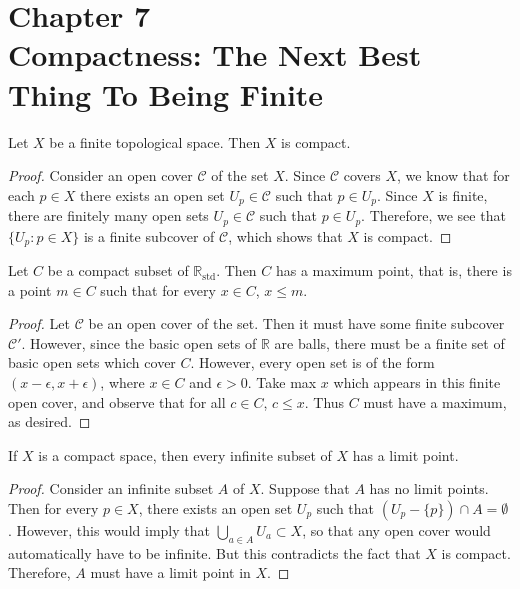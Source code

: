 \documentclass[a4paper,12pt,twoside]{hmcpset}
\begin{document}
\section*{Chapter 7\\ Compactness: The Next Best Thing To Being Finite}

\begin{problem}[Theorem 7.1] Let $X$ be a finite topological space.
    Then $X$ is compact.
\end{problem}

\begin{proof}
    Consider an open cover $\mathcal{C}$ of the set $X$. Since
    $\mathcal{C}$ covers $X$, we know that for each $p \in X$ there
    exists an open set $U_p \in \mathcal{C}$ such that $p \in U_p$.
    Since $X$ is finite, there are finitely many open sets $U_p \in
    \mathcal{C}$ such that $p \in U_p$. Therefore, we see that $\{U_p
    : p \in X\}$ is a finite subcover of $\mathcal{C}$, which shows
    that $X$ is compact.
\end{proof}

\begin{problem}[Theorem 7.2] Let $C$ be a compact subset of
    $\mathbb{R}_{\text{std}}$. Then $C$ has a maximum point, that is,
    there is a point $m \in C$ such that for every $x \in C$, $x \le
    m$.
\end{problem}

\begin{proof}
    Let $\mathcal{C}$ be an open cover of the set. Then it must have
    some finite subcover $\mathcal{C}'$. However, since the basic open
    sets of $\mathbb{R}$ are balls, there must be a finite set of
    basic open sets which cover $C$. However, every open set is of the
    form $(x-\epsilon, x + \epsilon)$, where $x \in C$ and $\epsilon >
    0$. Take max $x$ which appears in this finite open cover, and
    observe that for all $c \in C$, $c \le x$. Thus $C$ must have a
    maximum, as desired.
\end{proof}  

\begin{problem}[Theorem 7.3] If $X$ is a compact space, then every
    infinite subset of $X$ has a limit point.
\end{problem}

\begin{proof}
    Consider an infinite subset $A$ of $X$. Suppose that $A$ has no
    limit points. Then for every $p \in X$, there exists an open set
    $U_p$ such that $(U_p - \{p\})\cap A = \emptyset$. However, this
    would imply that $\bigcup_{a \in A} U_a \subset X$, so that any
    open cover would automatically have to be infinite. But this
    contradicts the fact that $X$ is compact. Therefore, $A$ must have
    a limit point in $X$.
\end{proof}
\end{document}
